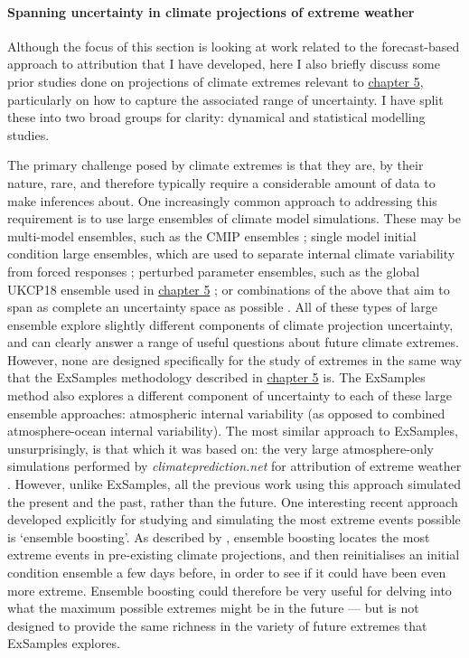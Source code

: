   \paragraph*{Spanning uncertainty in climate projections of extreme weather}

    Although the focus of this section is looking at work related to the forecast-based approach to attribution that I have developed, here I also briefly discuss some prior studies done on projections of climate extremes relevant to \hyperref[ch5]{chapter 5}, particularly on how to capture the associated range of uncertainty. I have split these into two broad groups for clarity: dynamical and statistical modelling studies.

    The primary challenge posed by climate extremes is that they are, by their nature, rare, and therefore typically require a considerable amount of data to make inferences about. One increasingly common approach to addressing this requirement is to use large ensembles of climate model simulations. These may be multi-model ensembles, such as the CMIP ensembles \citep{taylor_overview_2012,eyring_overview_2016}; single model initial condition large ensembles, which are used to separate internal climate variability from forced responses \citep{maher_large_2021}; perturbed parameter ensembles, such as the global UKCP18 ensemble used in \hyperref[ch5]{chapter 5} \citep{lowe_ukcp18_2018}; or combinations of the above that aim to span as complete an uncertainty space as possible \citep{stainforth_uncertainty_2005,frame_climatepredictionnet_2009}. All of these types of large ensemble explore slightly different components of climate projection uncertainty, and can clearly answer a range of useful questions about future climate extremes. However, none are designed specifically for the study of extremes in the same way that the ExSamples methodology described in \hyperref[ch5]{chapter 5} is. The ExSamples method also explores a different component of uncertainty to each of these large ensemble approaches: atmospheric internal variability (as opposed to combined atmosphere-ocean internal variability). The most similar approach to ExSamples, unsurprisingly, is that which it was based on: the very large atmosphere-only simulations performed by \emph{climateprediction.net} for attribution of extreme weather \citep{pall_anthropogenic_2011,schaller_human_2016}. However, unlike ExSamples, all the previous work using this approach simulated the present and the past, rather than the future. One interesting recent approach developed explicitly for studying and simulating the most extreme events possible is `ensemble boosting'. As described by \citet{gessner_very_2021}, ensemble boosting locates the most extreme events in pre-existing climate projections, and then reinitialises an initial condition ensemble a few days before, in order to see if it could have been even more extreme. Ensemble boosting could therefore be very useful for delving into what the maximum possible extremes might be in the future --- but is not designed to provide the same richness in the variety of future extremes that ExSamples explores.

